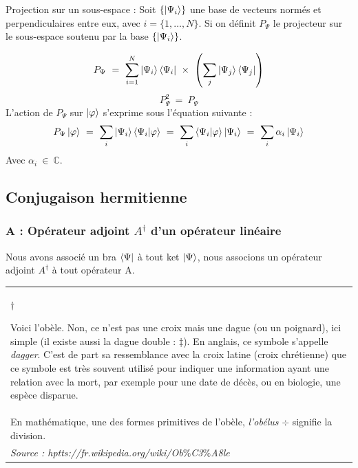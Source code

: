 \documentclass[12pt,a4paper,titlepage]{book}
\begin{document}
Projection sur un sous-espace : Soit $\lbrace \ket{\Psi_i} \rbrace$ une base de vecteurs normés et perpendiculaires entre eux, avec $i = \lbrace 1, \ldots, N \rbrace$. Si on définit $P_{\Psi}$ le projecteur sur le sous-espace soutenu par la base $\lbrace \ket{\Psi_i} \rbrace$.

\begin{equation*}
P_{\Psi} ~=~ \sum\limits_{i=1}^{N} \ket{\Psi_i} \bra{\Psi_i} ~\times~ \left( \sum\limits_{j} \ket{\Psi_j} \bra{\Psi_j} \right)
\end{equation*}
\begin{equation*}
P_{\Psi}^2 ~=~ P_{\Psi}
\end{equation*}
L'action de $P_{\Psi}$ sur $\ket{\varphi}$ s'exprime sous l'équation suivante :\\
\begin{equation*}
P_{\Psi} \ket{\varphi} ~=~ \sum\limits_i \ket{\Psi_i} \braket{\Psi_i | \varphi} ~=~ \sum\limits_i \braket{\Psi_i | \varphi} \ket{\Psi_i} ~=~ \sum\limits_i \alpha_i \ket{\Psi_i}
\end{equation*}
Avec $\alpha_i ~\in~ \mathbb{C}$.

\subsection{Conjugaison hermitienne}
\subsubsection{A : Opérateur adjoint $A^{\dagger}$ d'un opérateur linéaire}
Nous avons associé un bra $\bra{\Psi}$ à tout ket $\ket{\Psi}$, nous associons un opérateur adjoint $A^{\dagger}$ à tout opérateur A.\\

\begin{tabular}{|p{15cm}|}
\hline
\begin{center}
{\Huge{$\dagger$}}
\end{center}
Voici l'obèle. Non, ce n'est pas une croix mais une dague (ou un poignard), ici simple (il existe aussi la dague double : $\ddagger$). En anglais, ce symbole s'appelle \textit{dagger}. C'est de part sa ressemblance avec la croix latine (croix chrétienne) que ce symbole est très souvent utilisé pour indiquer une information ayant une relation avec la mort, par exemple pour une date de décès, ou en biologie, une espèce disparue.\\

En mathématique, une des formes primitives de l'obèle, \textit{l'obélus} $\div$ signifie la division.\\

\textit{Source : hptts://fr.wikipedia.org/wiki/Ob$\%$C3$\%$A8le}\\
\hline
\end{tabular}\\
\end{document}
